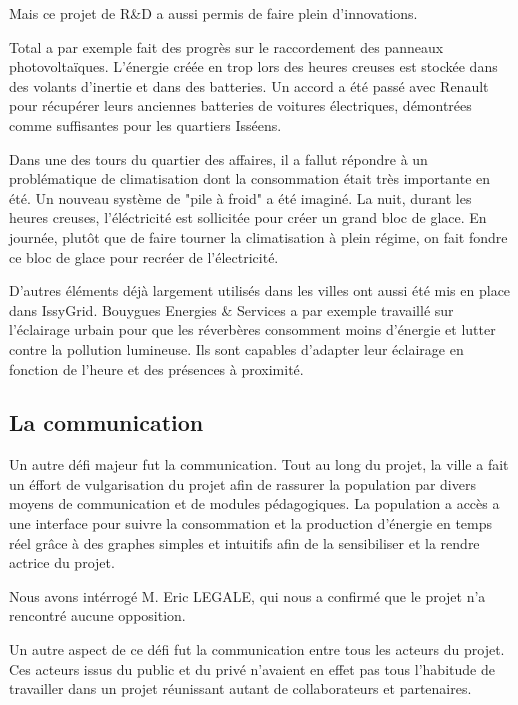 Mais ce projet de R\&D a aussi permis de faire plein d'innovations.

Total a par exemple fait des progrès sur le raccordement des panneaux photovoltaïques.
L'énergie créée en trop lors des heures creuses est stockée dans des volants d'inertie et dans des
batteries. Un accord a été passé avec Renault pour récupérer leurs anciennes batteries de voitures
électriques, démontrées comme suffisantes pour les quartiers Isséens.

Dans une des tours du quartier des affaires, il a fallut répondre à un problématique de climatisation
dont la consommation était très importante en été.
Un nouveau système de "pile à froid" a été imaginé.
La nuit, durant les heures creuses, l'éléctricité est sollicitée pour créer un grand bloc de glace.
En journée, plutôt que de faire tourner la climatisation à plein régime, on fait
fondre ce bloc de glace pour recréer de l'électricité.

D'autres éléments déjà largement utilisés dans les villes ont aussi été mis en place dans IssyGrid.
Bouygues Energies \& Services a par exemple travaillé sur l'éclairage urbain pour que les réverbères
consomment moins d'énergie et lutter contre la pollution lumineuse. Ils sont capables d'adapter
leur éclairage en fonction de l'heure et des présences à proximité.

\subsection{La communication}
Un autre défi majeur fut la communication.
Tout au long du projet, la ville a fait un éffort de vulgarisation du projet afin de rassurer
la population par divers moyens de communication et de modules pédagogiques. La population a accès
a une interface pour suivre la consommation et la production d'énergie en temps réel grâce à des
graphes simples et intuitifs afin de la sensibiliser et la rendre actrice du projet.

Nous avons intérrogé M. Eric LEGALE, qui nous a confirmé que le projet n'a rencontré aucune opposition.

Un autre aspect de ce défi fut la communication entre tous les acteurs du projet.
Ces acteurs issus du public et du privé n'avaient en effet pas tous l'habitude de travailler
dans un projet réunissant autant de collaborateurs et partenaires.


